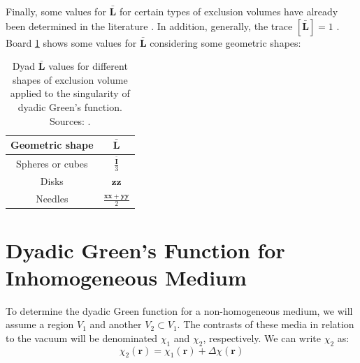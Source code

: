 			Finally, some values for $\mathbf{\bar{L}}$ for certain types of exclusion volumes have already been determined in the literature \citep{yaghjian1980electric, lee1980singularity}. In addition, generally, the trace $\left[\mathbf{\bar{L}}\right]=1$ \citep{yaghjian1980electric}. Board \ref{board:Lvalues} shows some values for $\mathbf{\bar{L}}$ considering some geometric shapes:
			
			\begin{table}[!htb]
				\centering
				\caption{Dyad $\mathbf{\bar{L}}$ values for different shapes of exclusion volume applied to the singularity of dyadic Green's function. Sources: \citep{yaghjian1980electric,lee1980singularity}.}
				\renewcommand{\arraystretch}{2.0}
				\begin{tabular}{cc}
					\textbf{Geometric shape} & $\mathbf{\bar{L}}$  \\\hline\hline
					Spheres or cubes & $\frac{\mathbf{\bar{I}}}{3}$ \\
					Disks & $\mathbf{z}\mathbf{z}$ \\
					Needles & $\frac{\mathbf{x}\mathbf{x}+\mathbf{y}\mathbf{y}}{2}$ \\
				\end{tabular}
				\label{board:Lvalues}
			\end{table}
			
		
		\section{Dyadic Green's Function for Inhomogeneous Medium}\label{app:green:3}
			
			To determine the dyadic Green function for a non-homogeneous medium, we will assume a region $V_1$  and another $V_2\subset V_1$. The contrasts of these media in relation to the vacuum will be denominated $\chi_{1}$ and $\chi_{2}$, respectively. We can write $\chi_{2}$ as:
			\begin{equation}
				\chi_{2}(\mathbf{r}) = \chi_{1}(\mathbf{r}) + \Delta\chi(\mathbf{r}) \label{eq:app:green:25}
			\end{equation}
		

